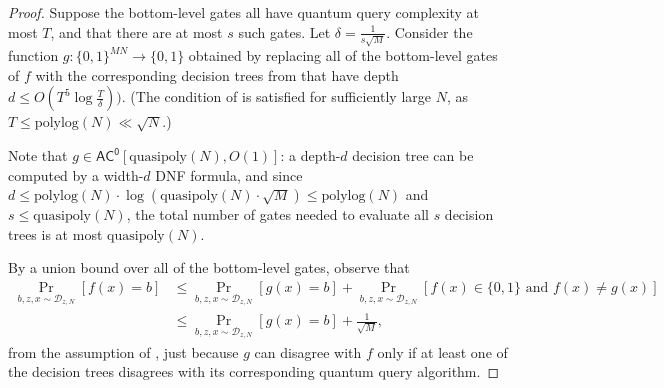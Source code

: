 \documentclass[11pt]{article}%
\newcommand{\polylog}{\mathrm{polylog}}
\newcommand{\quasipoly}{\mathrm{quasipoly}}
\begin{document}
\begin{proof}
Suppose the bottom-level gates all have quantum query complexity at most $T$, and that there are at most $s$ such gates. Let $\delta = \frac{1}{s\sqrt{M}}$. Consider the function $g: \{0,1\}^{MN} \to \{0,1\}$ obtained by replacing all of the bottom-level gates of $f$ with the corresponding decision trees from  that have depth $d \le O\left(T^5\log \frac{T}{\delta}\right))$. (The condition of  is satisfied for sufficiently large $N$, as $T \le \polylog(N) \ll \sqrt{N}$.)

Note that $g \in \mathsf{AC^0}[\quasipoly(N), O(1)]$: a depth-$d$ decision tree can be computed by a width-$d$ DNF formula, and since $d \le \polylog(N) \cdot \log\left(\quasipoly(N) \cdot \sqrt{M}\right) \le \polylog(N)$ and $s \le \quasipoly(N)$, the total number of gates needed to evaluate all $s$ decision trees is at most $\quasipoly(N)$.

By a union bound over all of the bottom-level gates, observe that
\begin{align}
\Pr_{b,z,x \sim \mathcal{D}_{z,N}} \left[f(x) = b \right]
&\le \Pr_{b,z,x \sim \mathcal{D}_{z,N}} \left[g(x) = b \right] + \Pr_{b,z,x \sim \mathcal{D}_{z,N}}\left[f(x) \in \{0,1\} \text{ and } f(x) \neq g(x) \right]\nonumber\\
&\le \Pr_{b,z,x \sim \mathcal{D}_{z,N}} \left[g(x) = b \right] + \frac{1}{\sqrt{M}},\label{eq:forrelation_of_ors_classical_sim}
\end{align}
from the assumption of , just because $g$ can disagree with $f$ only if at least one of the decision trees disagrees with its corresponding quantum query algorithm.


\end{proof}
\end{document}
